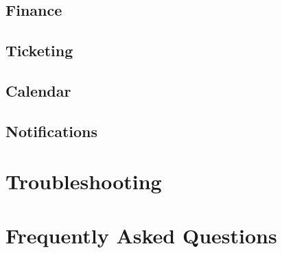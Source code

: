 \documentclass[12pt]{article}
\begin{document}
\subsection{Finance}

\subsection{Ticketing}

\subsection{Calendar}

\subsection{Notifications}



\section{Troubleshooting}

\section{Frequently Asked Questions}

\end{document}
